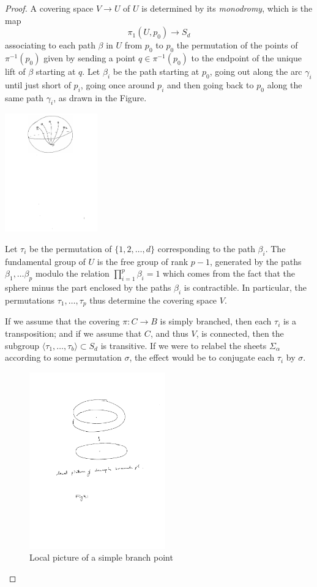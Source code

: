 \begin{proof}
   
A covering space $V \to U$ of $U$ is determined by its \emph{monodromy}, which is the map
   $$
   \pi_1(U, p_0) \to S_d
   $$
associating to each path  $\beta$ in $U$ from $p_0$ to $p_0$  the permutation of the points of $\pi^{-1}(p_0)$ given by sending a point $q \in \pi^{-1}(p_0)$ to the endpoint of the unique lift of $\beta$ starting at $q$. Let $\beta_i$ be the path starting at $p_0$, going out along the arc $\gamma_i$ until just short of $p_i$, going once around $p_i$ and then going back to $p_0$ along the same path $\gamma_i$, as drawn in the Figure. 

\centerline{ \includegraphics[height=2in]{"pic42"}}

Let $\tau_i$ be the permutation of $\{1,2,\dots,d\}$ corresponding to the path $\beta_i$. The fundamental group of $U$ is the free group of rank $p-1$, generated by the paths $\beta_1,\dots \beta_p$ modulo the relation $\prod_{i=1}^p \beta_i = 1$
which comes from the fact that the sphere minus the part enclosed by the paths $\beta_i$ is 
contractible. In particular, the permutations $\tau_1,\dots,\tau_p$ thus determine the covering space $V$.
 
If we assume that the covering
$\pi : C \to B$ is simply branched, then each $\tau_i$ is a transposition; and if we assume that
$C$, and thus $V$, is connected, then the subgroup $\langle \tau_1, \dots, \tau_b \rangle \subset S_d$ is transitive. If we were to relabel the sheets $\Sigma_\alpha$ according to some permutation $\sigma$, the effect would be to conjugate each $\tau_i$ by $\sigma$. 

\begin{figure}
 \caption{Local picture of a simple branch point}
\centerline {\includegraphics[height=3in]{"Fig5.1.pdf"}}
\end{figure}


\end{proof}
